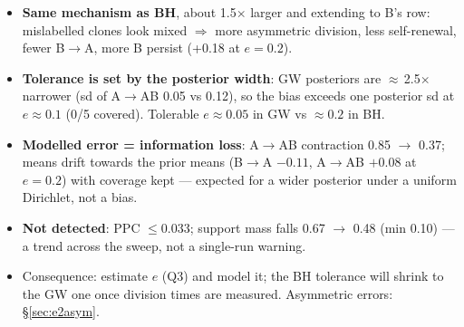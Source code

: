 \documentclass[10pt,a4paper]{article}
\newcommand{\blk}[1]{\par\needspace{5\baselineskip}\smallskip{\sffamily\bfseries\color{inkgray}#1}\par}
\newcommand{\Comment}{\blk{Comment}}
\begin{document}
\Comment
\begin{itemize}
\item \textbf{Same mechanism as BH}, about 1.5$\times$ larger and extending to B's row: mislabelled clones look mixed $\Rightarrow$ more asymmetric division, less self-renewal, fewer B$\to$A, more B persist (+0.18 at $e=0.2$).
\item \textbf{Tolerance is set by the posterior width}: GW posteriors are $\approx$\,2.5$\times$ narrower (sd of A$\to$AB 0.05 vs 0.12), so the bias exceeds one posterior sd at $e \approx 0.1$ (0/5 covered). Tolerable $e \approx 0.05$ in GW vs $\approx 0.2$ in BH.
\item \textbf{Modelled error = information loss}: A$\to$AB contraction 0.85 $\to$ 0.37; means drift towards the prior means (B$\to$A $-0.11$, A$\to$AB $+0.08$ at $e=0.2$) with coverage kept --- expected for a wider posterior under a uniform Dirichlet, not a bias.
\item \textbf{Not detected}: PPC $\le 0.033$; support mass falls 0.67 $\to$ 0.48 (min 0.10) --- a trend across the sweep, not a single-run warning.
\item Consequence: estimate $e$ (Q3) and model it; the BH tolerance will shrink to the GW one once division times are measured. Asymmetric errors: \S\ref{sec:e2asym}.
\end{itemize}

\end{document}
